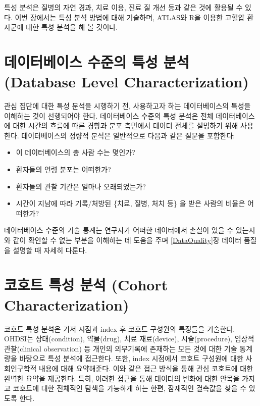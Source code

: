\documentclass[11pt]{book}
\providecommand{\tightlist}{%
  \setlength{\itemsep}{0pt}\setlength{\parskip}{0pt}}
\theoremstyle{definition}
\theoremstyle{definition}
\theoremstyle{definition}
\theoremstyle{remark}
\begin{document}
특성 분석은 질병의 자연 경과, 치료 이용, 진료 질 개선 등과 같은 것에
활용될 수 있다. 이번 장에서는 특성 분석 방법에 대해 기술하며, ATLAS와
R을 이용한 고혈압 환자군에 대한 특성 분석을 해 볼
것이다.
  

\section{데이터베이스 수준의 특성 분석 (Database Level
Characterization)}\label{----database-level-characterization}

관심 집단에 대한 특성 분석을 시행하기 전, 사용하고자 하는 데이터베이스의
특성을 이해하는 것이 선행되어야 한다. 데이터베이스 수준의 특성 분석은
전체 데이터베이스에 대한 시간의 흐름에 따른 경향과 분포 측면에서 데이터
전체를 설명하기 위해 사용한다. 데이터베이스의 정량적 분석은 일반적으로
다음과 같은 질문을 포함한다:

\begin{itemize}
\tightlist
\item
  이 데이터베이스의 총 사람 수는 몇인가?
\item
  환자들의 연령 분포는 어떠한가?
\item
  환자들의 관찰 기간은 얼마나 오래되었는가?
\item
  시간이 지남에 따라 기록/처방된 \{치료, 질병, 처치 등\} 을 받은 사람의
  비율은 어떠한가?
\end{itemize}

데이터베이스 수준의 기술 통계는 연구자가 어떠한 데이터에서 손실이 있을
수 있는지와 같이 확인할 수 없는 부분을 이해하는 데 도움을 주며
\ref{DataQuality}장 데이터 품질을 설명할 때 자세히 다룬다.

\section{코호트 특성 분석 (Cohort
Characterization)}\label{---cohort-characterization}

코호트 특성 분석은 기저 시점과 index 후 코호트 구성원의 특징들을
기술한다. OHDSI는 상태(condition), 약물(drug), 치료 재료(device),
시술(procedure), 임상적 관찰(clinical observation) 등 개인의 의무기록에
존재하는 모든 것에 대한 기술 통계량을 바탕으로 특성 분석에 접근한다.
또한, index 시점에서 코호트 구성원에 대한 사회인구학적 내용에 대해
요약해준다. 이와 같은 접근 방식을 통해 관심 코호트에 대한 완벽한 요약을
제공한다. 특히, 이러한 접근을 통해 데이터의 변화에 대한 안목을 가지고
코호트에 대한 전체적인 탐색을 가능하게 하는 한편, 잠재적인 결측값을 찾을
수 있도록 한다.
\end{document}
